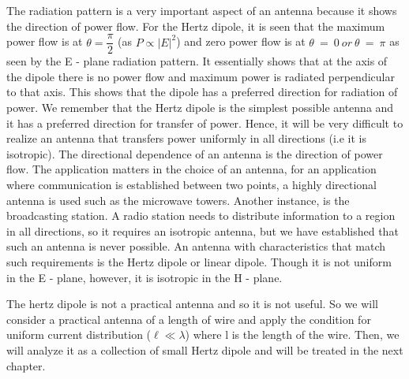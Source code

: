 The radiation pattern is a very important aspect of an antenna because it shows the direction of power flow. For the Hertz dipole, it is seen that the maximum power flow is at $\theta = \dfrac{\pi}{2}$ (as $P \propto  |E|^2 $) and zero power flow is at $\theta\ =\ 0 \ or\ \theta\ =\ \pi $ as seen by the E - plane radiation pattern. It essentially shows that at the axis of the dipole there is no power flow and maximum power is radiated perpendicular to that axis. This shows that the dipole has a preferred direction for radiation of power. We remember that the Hertz dipole is the simplest possible antenna and it has a preferred direction for transfer of power. Hence, it will be very difficult to realize an antenna that transfers power uniformly in all directions (i.e it is isotropic). The directional dependence of an antenna is the direction of power flow. The application matters in the choice of an antenna, for an application where communication is established between two points, a highly directional antenna is used such as the microwave towers. Another instance, is the broadcasting station. A radio station needs to distribute information to a region in all directions, so it requires an isotropic antenna, but we have established that such an antenna is never possible. An antenna with characteristics that match such requirements is the Hertz dipole or linear dipole. Though it is not uniform in the E - plane, however, it is isotropic in the H - plane. 

The hertz dipole is not a practical antenna and so it is not useful. So we will consider a practical antenna of a length of wire and apply the condition for uniform current distribution ($\ell \ll \lambda$) where l is the length of the wire. Then, we will analyze it as a collection of small Hertz dipole and will be treated in the next chapter.